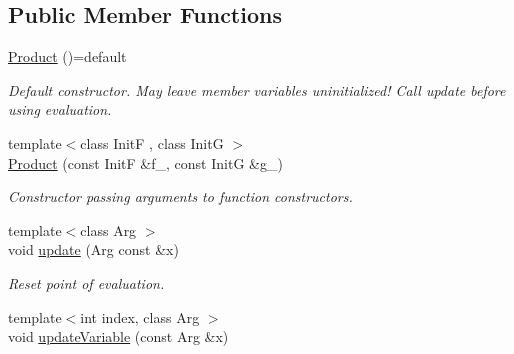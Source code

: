 \subsection*{Public Member Functions}
\begin{DoxyCompactItemize}
\item 
\hypertarget{structFunG_1_1MathematicalOperations_1_1Product_a46aa694d746ce9c1bc9c3065c90509fe}{\hyperlink{structFunG_1_1MathematicalOperations_1_1Product_a46aa694d746ce9c1bc9c3065c90509fe}{Product} ()=default}\label{structFunG_1_1MathematicalOperations_1_1Product_a46aa694d746ce9c1bc9c3065c90509fe}

\begin{DoxyCompactList}\small\item\em Default constructor. May leave member variables uninitialized! Call update before using evaluation. \end{DoxyCompactList}\item 
{\footnotesize template$<$class Init\-F , class Init\-G $>$ }\\\hyperlink{structFunG_1_1MathematicalOperations_1_1Product_a98d62512443b8c9d31466998b0fa6ee8}{Product} (const Init\-F \&f\-\_\-, const Init\-G \&g\-\_\-)
\begin{DoxyCompactList}\small\item\em Constructor passing arguments to function constructors. \end{DoxyCompactList}\item 
\hypertarget{structFunG_1_1MathematicalOperations_1_1Product_a5b45c1bac06651ee5b6ea79fb5128ef9}{{\footnotesize template$<$class Arg $>$ }\\void \hyperlink{structFunG_1_1MathematicalOperations_1_1Product_a5b45c1bac06651ee5b6ea79fb5128ef9}{update} (Arg const \&x)}\label{structFunG_1_1MathematicalOperations_1_1Product_a5b45c1bac06651ee5b6ea79fb5128ef9}

\begin{DoxyCompactList}\small\item\em Reset point of evaluation. \end{DoxyCompactList}\item 
\hypertarget{structFunG_1_1MathematicalOperations_1_1Product_a099d1b61893364d6536925d32c00ad31}{{\footnotesize template$<$int index, class Arg $>$ }\\void \hyperlink{structFunG_1_1MathematicalOperations_1_1Product_a099d1b61893364d6536925d32c00ad31}{update\-Variable} (const Arg \&x)}\label{structFunG_1_1MathematicalOperations_1_1Product_a099d1b61893364d6536925d32c00ad31}


\end{DoxyCompactItemize}
